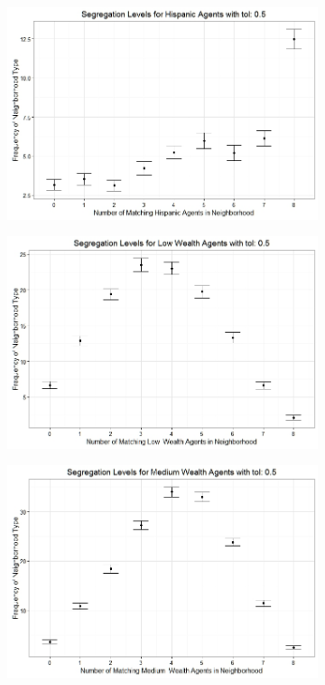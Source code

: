 \begin{figure}[h!]
\begin{subfigure}{.5\textwidth}
\includegraphics[scale=.35]{figures/2000_5_Hispanic.jpeg}
\end{subfigure}%
\begin{subfigure}{.5\textwidth}
  \centering
\includegraphics[scale=.35]{figures/2000_5_Low.jpeg}
\end{subfigure}
\hfill \break \hfill \break
\begin{subfigure}{.5\textwidth}
  \centering
\includegraphics[scale=.35]{figures/2000_5_Med.jpeg}

\end{subfigure}
\end{figure}
